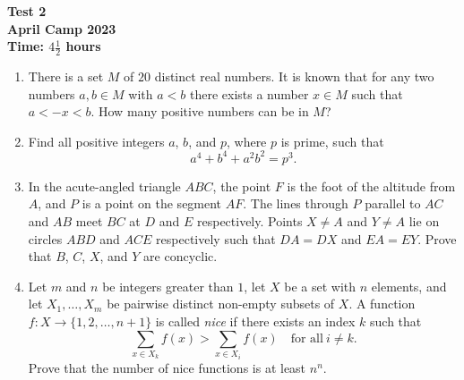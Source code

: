\documentclass{article}
\begin{document}
\thispagestyle{empty}

\begin{center}
  \textbf{\Large Test 2}
  \\ \vspace{1em}
  \textbf{\large April Camp 2023}
  \\ \vspace{1em}
  \textbf{\large Time: $4\frac{1}{2}$ hours}
\end{center}

\bigskip
\vfill

\begin{enumerate}[itemsep=2\bigskipamount]

\item %
There is a set $M$ of $20$ distinct real numbers.
It is known that for any two numbers $a,b \in M$ with $a < b$ there exists a number $x \in M$ such that $a < -x < b$.
How many positive numbers can be in $M$?


\item %
Find all positive integers $a$, $b$, and $p$, where $p$ is prime, such that
\[ a^4 +b^4 +a^2b^2 = p^3. \]



\item %
In the acute-angled triangle $ABC$, the point $F$ is the foot of the altitude from $A$, and $P$ is a point on the segment $AF$.
The lines through $P$ parallel to $AC$ and $AB$ meet $BC$ at $D$ and $E$ respectively.
Points $X \neq A$ and $Y \neq A$ lie on circles $ABD$ and $ACE$ respectively such that $DA = DX$ and $EA = EY$.
Prove that $B$, $C$, $X$, and $Y$ are concyclic.


\item %
Let $m$ and $n$ be integers greater than $1$, let $X$ be a set with $n$ elements, and let $X_1, \dotsc, X_m$ be pairwise distinct non-empty subsets of $X$.
A function $f : X \to \{1, 2, \dotsc, n+1\}$ is called \emph{nice} if there exists an index $k$ such that
\[ \sum_{x \in X_k} f(x) > \sum_{x \in X_i} f(x) \quad\text{for all}\ i \neq k. \]
Prove that the number of nice functions is at least $n^n$.


\end{enumerate}
\end{document}
